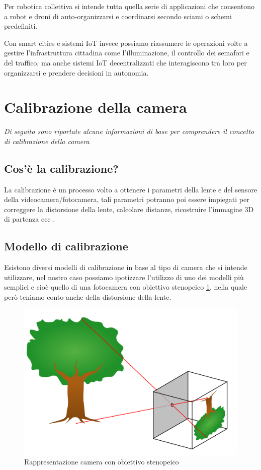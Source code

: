 \documentclass[12pt,a4paper,openright,twoside]{book}
\begin{document}
Per robotica collettiva si intende tutta quella serie di applicazioni che consentono a robot e droni di auto-organizzarsi e coordinarsi secondo sciami o schemi predefiniti.


Con smart cities e sistemi IoT invece possiamo riassumere le operazioni volte a gestire l'infrastruttura cittadina come l'illuminazione, il controllo dei semafori e del traffico, ma anche sistemi IoT decentralizzati che interagiscono tra loro per organizzarsi e prendere decisioni in autonomia.

\section{Calibrazione della camera} \label{sec:calibrazione_della_camera}
\textit{Di seguito sono riportate alcune informazioni di base per comprendere il concetto di calibrazione della camera}	
\subsection{Cos'è la calibrazione?}
La calibrazione è un processo volto a ottenere i parametri della lente e del sensore della videocamera/fotocamera,
tali parametri potranno poi essere impiegati per correggere la distorsione della lente, calcolare distanze, ricostruire l'immagine 3D di partenza ecc \cite{cameraCalibrationMathWorks}.
\subsection{Modello di calibrazione}
Esistono diversi modelli di calibrazione in base al tipo di camera che si intende utilizzare, nel nostro caso possiamo ipotizzare l'utilizzo di uno dei modelli più semplici e cioè quello di una fotocamera con obiettivo stenopeico \ref{fig:pinhole_camera}, nella quale però teniamo conto anche della distorsione della lente. \cite{pinholeCamera} \cite{pinholeCameraModel} 
\begin{figure}[h!]
	\centering
	\includegraphics[width=0.5\linewidth]{./figures/Pinhole-camera.png}
	\caption{Rappresentazione camera con obiettivo stenopeico}
	\label{fig:pinhole_camera}
\end{figure}
\end{document}

